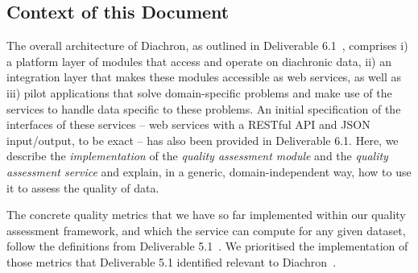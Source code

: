 
\subsection{Context of this Document}
\label{sec:ContextDoc} 

The overall architecture of Diachron, as outlined in Deliverable 6.1~\cite[section~5]{diachron-d6.1}, comprises i) a platform layer of modules that access and operate on diachronic data, ii) an integration layer that makes these modules accessible as web services, as well as iii) pilot applications that solve domain-specific problems and make use of the services to handle data specific to these problems.  An initial specification of the interfaces of these services – web services with a RESTful API and JSON input/output, to be exact – has also been provided in Deliverable 6.1.  Here, we describe the \emph{implementation} of the \emph{quality assessment module} and the \emph{quality assessment service} and explain, in a generic, domain-independent way, how to use it to assess the quality of data.

The concrete quality metrics that we have so far implemented within our quality assessment framework, and which the service can compute for any given dataset, follow the definitions from Deliverable 5.1~\cite{diachron-d5.1}.
We prioritised the implementation of those metrics that Deliverable 5.1 identified relevant to Diachron~\cite[section~4]{diachron-d5.1}.



